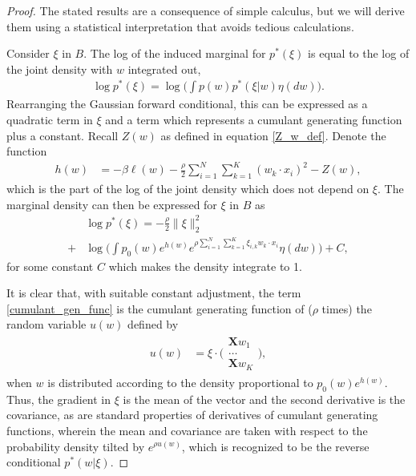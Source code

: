 \documentclass{article}
\numberwithin{equation}{section}
\theoremstyle{Lemma}
\theoremstyle{Corollary}
\theoremstyle{Theorem}
\theoremstyle{Remark}
\begin{document}
\begin{proof} 
    The stated results are a consequence of simple calculus, but we will derive them using a statistical interpretation that avoids tedious calculations.
    
 Consider $\xi$ in $B$. The log of the induced marginal for $p^{*}(\xi)$ is equal to the log of the joint density with $w$ integrated out,
    \begin{align}
        \log p^{*}(\xi)= \log \Big(\int p(w)p^{*}(\xi|w)\eta(dw)\Big).
    \end{align}
    Rearranging the Gaussian forward conditional, this can be expressed as a quadratic term in $\xi$ and a term which represents a cumulant generating function plus a constant. Recall $Z(w)$ as defined in equation \eqref{Z_w_def}. Denote the function
    \begin{align}
        h(w)&= -\beta \ell(w)-\frac{\rho}{2}\sum_{i=1}^{N}\sum_{k=1}^{K}(w_{k}\cdot x_{i})^{2} - Z(w),
    \end{align}
    which is the part of the log of the joint density which does not depend on $\xi$. The marginal density can then be expressed for $\xi$ in $B$ as
    \begin{align}
    &\log p^{*}(\xi)=-\frac{\rho}{2}\|\xi\|_{2}^{2}\\
    +&\log \Big(\int p_{0}(w)e^{h(w)}e^{\rho \sum_{i=1}^{N}\sum_{k=1}^{K}\xi_{i,k}w_{k} \cdot x_{i} }\eta(dw)\Big)+C, \label{cumulant_gen_func}
    \end{align}
    for some constant $C$ which makes the density integrate to 1. 
    
    It is clear that, with suitable constant adjustment, the term \eqref{cumulant_gen_func} is the cumulant generating function of ($\rho$ times) the random variable $u(w)$ defined by
    \begin{align}
        u(w)&= \xi \cdot \Big(\substack{
                \textbf{X} w_{1}\\
                \ldots\\
                \textbf{X} w_{K}
            }\Big),
    \end{align}
    when $w$ is distributed according to the density proportional to $p_{0}(w)e^{h(w)}$. Thus, the gradient in $\xi$ is the mean of the vector and the second derivative is the covariance, as are standard properties of derivatives of cumulant generating functions, wherein the mean and covariance are taken with respect to the probability density tilted by $e^{\rho u(w)}$, which is recognized to be the reverse conditional $p^{*}(w|\xi)$.
\end{proof}
\end{document}
